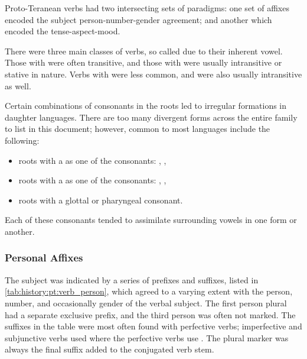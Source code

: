 \documentclass[grammar]{subfiles}
\begin{document}
Proto-Teranean verbs had two intersecting sets of paradigms: one set of affixes
encoded the subject person-number-gender agreement; and another which encoded
the tense-aspect-mood.  

There were three main classes of verbs, so called due to their inherent vowel.
Those with  were often transitive, and those with  were
usually intransitive or stative in nature.  Verbs with  were less
common, and were also usually intransitive as well.

Certain combinations of consonants in the roots led to irregular formations in
daughter languages.  There are too many divergent forms across the entire
family to list in this document; however, common to most languages include the
following:

\begin{itemize}
  \item roots with a  as one of the consonants: ,
    , 
  \item roots with a  as one of the consonants: ,
    , 
  \item roots with a glottal or pharyngeal consonant.
\end{itemize}

Each of these consonants tended to assimilate surrounding vowels in one form or
another.


\subsubsection{Personal Affixes}
\label{sssec:history:pt:vm:subject_agreement}

The subject was indicated by a series of prefixes and suffixes, listed in
\cref{tab:history:pt:verb_person}, which agreed to a varying extent with the
person, number, and occasionally gender of the verbal subject.  The first
person plural had a separate exclusive prefix, and the third person was often
not marked.  The suffixes in the table were most often found with perfective
verbs; imperfective and subjunctive verbs used  where the
perfective verbs use .  The plural marker  was always
the final suffix added to the conjugated verb stem.
\end{document}
